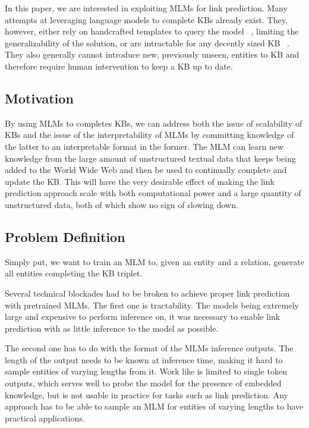 \documentclass[11pt,a4paper]{article}
\newcommand{\CiteT}[1]{\citet{#1}} \newcommand{\CiteP}[1]{~\citep{#1}} \newcommand{\CodeT}[1]{\texttt{#1}}
\begin{document}
In this paper, we are interested in exploiting MLMs for link prediction.
Many attempts at leveraging language models to complete KBs already exist.
They, however, either rely on handcrafted templates to query the model \CiteP{LMKB}, limiting the generalizability of the solution, or are intractable for any decently sized KB \CiteP{KG-BERT}.
They also generally cannot introduce new, previously unseen, entities to KB and therefore require human intervention to keep a KB up to date. 

\subsection{Motivation}



By using MLMs to completes KBs, we can address both the issue of scalability of KBs and the issue of the interpretability of MLMs by committing knowledge of the latter to an interpretable format in the former.
The MLM can learn new knowledge from the large amount of unstructured textual data that keeps being added to the World Wide Web and then be used to continually complete and update the KB. 
This will have the very desirable effect of making the link prediction approach scale with both computational power and a large quantity of unstructured data, both of which show no sign of slowing down.


\subsection{Problem Definition}

Simply put, we want to train an MLM to, given an entity and a relation, generate all entities completing the KB triplet.

Several technical blockades had to be broken to achieve proper link prediction with pretrained MLMs.
The first one is tractability.
The models being extremely large and expensive to perform inference on, it was necessary to enable link prediction with as little inference to the model as possible.

The second one has to do with the format of the MLMs inference outputs.
The length of the output needs to be known at inference time, making it hard to sample entities of varying lengths from it.
Work like \CiteT{LMKB} is limited to single token outputs, which serves well to probe the model for the presence of embedded knowledge, but is not usable in practice for tasks such as link prediction.
Any approach has to be able to sample an MLM for entities of varying lengths to have practical applications.
\end{document}
